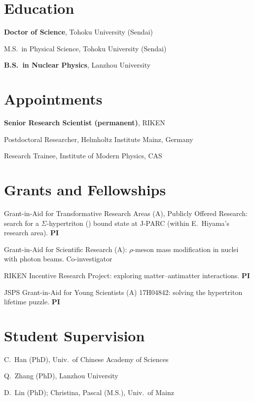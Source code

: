 \documentclass[a4paper,11pt,fontset=none]{ctexart}
\newcommand{\cvrow}[2]{%
  \noindent\makebox[2.7cm][l]{\textcolor{impblue}{\small\bfseries #1}}%
  \parbox[t]{\dimexpr\linewidth-2.8cm\relax}{#2}\par\vspace{3pt}}
\begin{document}
\begin{minipage}[t]{0.49\linewidth}
\section{Education}
\cvrow{2006--2009}{\textbf{Doctor of Science}, Tohoku University (Sendai)}
\cvrow{2004--2006}{M.S.\ in Physical Science, Tohoku University (Sendai)}
\cvrow{1998--2002}{\textbf{B.S.\ in Nuclear Physics}, Lanzhou University}
\end{minipage}\hfill
\begin{minipage}[t]{0.49\linewidth}
\section{Appointments}
\cvrow{2012--now}{\textbf{Senior Research Scientist (permanent)}, RIKEN}
\cvrow{2009--2012}{Postdoctoral Researcher, Helmholtz Institute Mainz, Germany}
\cvrow{2002--2004}{Research Trainee, Institute of Modern Physics, CAS}
\end{minipage}

\begin{minipage}[t]{0.52\linewidth}
\section{Grants and Fellowships}
\cvrow{2026--2027}{Grant-in-Aid for Transformative Research Areas (A), Publicly Offered Research: search for a $\Sigma$-hypertriton (\hsig{3}{H}) bound state at J-PARC (within E.\ Hiyama's research area). \textbf{PI}}
\cvrow{2024--2028}{Grant-in-Aid for Scientific Research (A): $\rho$-meson mass modification in nuclei with photon beams. Co-investigator}
\cvrow{2023--2025}{RIKEN Incentive Research Project: exploring matter--antimatter interactions. \textbf{PI}}
\cvrow{2017--2020}{JSPS Grant-in-Aid for Young Scientists (A) 17H04842: solving the hypertriton lifetime puzzle. \textbf{PI}}
\end{minipage}\hfill
\begin{minipage}[t]{0.44\linewidth}
\section{Student Supervision}
\cvrow{2017--2020}{C.\ Han (PhD), Univ.\ of Chinese Academy of Sciences}
\cvrow{2012--2014}{Q.\ Zhang (PhD), Lanzhou University}
\cvrow{2010--2011}{D.\ Lin (PhD); Christina, Pascal (M.S.), Univ.\ of Mainz}
\end{minipage}
\end{document}
